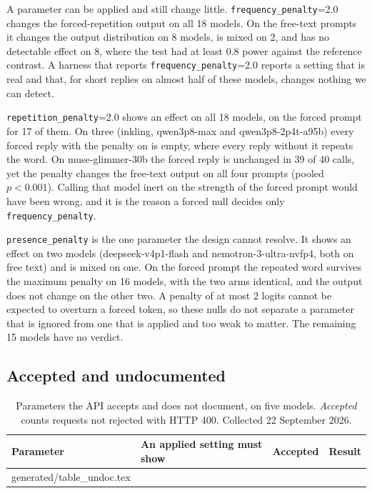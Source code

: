 \documentclass[10pt]{article}
\makeatletter
\newcommand{\p}[1]{\texttt{#1}}
\newcommand{\inputrows}[1]{\@@input #1 }
\makeatother
\begin{document}
A parameter can be applied and still change little. \p{frequency\_penalty}=2.0 changes the forced-repetition output on all 18 models. On the free-text prompts it changes the output distribution on 8 models, is mixed on 2, and has no detectable effect on 8, where the test had at least 0.8 power against the reference contrast. A harness that reports \p{frequency\_penalty}=2.0 reports a setting that is real and that, for short replies on almost half of these models, changes nothing we can detect.

\p{repetition\_penalty}=2.0 shows an effect on all 18 models, on the forced prompt for 17 of them. On three (inkling, qwen3p8-max and qwen3p8-2p4t-a95b) every forced reply with the penalty on is empty, where every reply without it repeats the word. On muse-glimmer-30b the forced reply is unchanged in 39 of 40 calls, yet the penalty changes the free-text output on all four prompts (pooled $p < 0.001$). Calling that model inert on the strength of the forced prompt would have been wrong, and it is the reason a forced null decides only \p{frequency\_penalty}.

\p{presence\_penalty} is the one parameter the design cannot resolve. It shows an effect on two models (deepseek-v4p1-flash and nemotron-3-ultra-nvfp4, both on free text) and is mixed on one. On the forced prompt the repeated word survives the maximum penalty on 16 models, with the two arms identical, and the output does not change on the other two. A penalty of at most 2 logits cannot be expected to overturn a forced token, so these nulls do not separate a parameter that is ignored from one that is applied and too weak to matter. The remaining 15 models have no verdict.

\subsection{Accepted and undocumented}
\label{sec:undoc}

\begin{table}[t]
\centering
\small
\caption{Parameters the API accepts and does not document, on five models. \emph{Accepted} counts requests not rejected with HTTP 400. Collected 22 September 2026.}
\label{tab:undoc}
\begin{tabularx}{\linewidth}{llcX}
\toprule
Parameter & An applied setting must show & Accepted & Result \\
\midrule
\inputrows{generated/table_undoc.tex}
\bottomrule
\end{tabularx}
\end{table}
\end{document}
